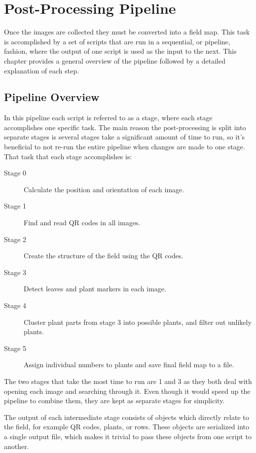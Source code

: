 
\cleardoublepage

\chapter{Post-Processing Pipeline}
\label{processing}

Once the images are collected they must be converted into a field map. This task is accomplished by a set of scripts that are run in a sequential, or pipeline, fashion, where the output of one script is used as the input to the next.  This chapter provides a general overview of the pipeline followed by a detailed explanation of each step.

\section{Pipeline Overview}
\label{processing-overview}

In this pipeline each script is referred to as a stage, where each stage accomplishes one specific task.  The main reason the post-processing is split into separate stages is several stages take a significant amount of time to run, so it's beneficial to not re-run the entire pipeline when changes are made to one stage.  That task that each stage accomplishes is:

\begin{description}
\item[Stage 0] Calculate the position and orientation of each image.
\item[Stage 1] Find and read QR codes in all images.
\item[Stage 2] Create the structure of the field using the QR codes.
\item[Stage 3] Detect leaves and plant markers in each image.
\item[Stage 4] Cluster plant parts from stage 3 into possible plants, and filter out unlikely plants.
\item[Stage 5] Assign individual numbers to plants and save final field map to a file. 
\end{description}

The two stages that take the most time to run are 1 and 3 as they both deal with opening each image and searching through it.  Even though it would speed up the pipeline to combine them, they are kept as separate stages for simplicity.
 
The output of each intermediate stage consists of objects which directly relate to the field, for example QR codes, plants, or rows.  These objects are serialized into a single output file, which makes it trivial to pass these objects from one script to another. 

